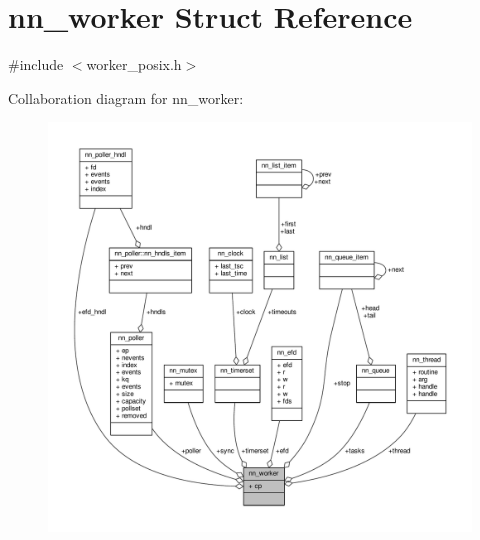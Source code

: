 \hypertarget{structnn__worker}{}\section{nn\+\_\+worker Struct Reference}
\label{structnn__worker}


{\ttfamily \#include $<$worker\+\_\+posix.\+h$>$}



Collaboration diagram for nn\+\_\+worker\+:\nopagebreak
\begin{figure}[H]
\begin{center}
\leavevmode
\includegraphics[width=350pt]{structnn__worker__coll__graph}
\end{center}
\end{figure}
